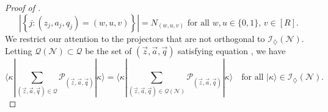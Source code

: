 \documentclass[../thesis-main/thesis-main]{subfiles}
\begin{document}
\begin{proof}[Proof of \protect{}]
\begin{equation}
\left|\left\{ j:(z_{j},a_{j},q_{j})=(w,u,v)\right\} \right|=N_{(w,u,v)}\text{ for all }w,u\in\{0,1\},\, v\in[R].\label{eq:satisfy_occ_numbers}
\end{equation}
We restrict our attention to the projectors that are not orthogonal to $\mathcal{I}_{\diamondsuit}(\mathcal{N})$. Letting $\mathcal{Q}(\mathcal{N})\subset\mathcal{Q}$ be the set of $(\vec{z},\vec{a},\vec{q})$ satisfying equation , we have
\begin{equation}
\langle\kappa|\sum_{(\vec{z},\vec{a},\vec{q})\in\mathcal{Q}}\mathcal{P}_{(\vec{z},\vec{a},\vec{q})}|\kappa\rangle=\langle\kappa|\sum_{(\vec{z},\vec{a},\vec{q})\in\mathcal{Q}(\mathcal{N})}\mathcal{P}_{(\vec{z},\vec{a},\vec{q})}|\kappa\rangle\quad\text{for all }|\kappa\rangle\in\mathcal{I}_{\diamondsuit}(\mathcal{N}).\label{eq:restrict_attention_mathcalN}
\end{equation}


\end{proof}
\end{document}
